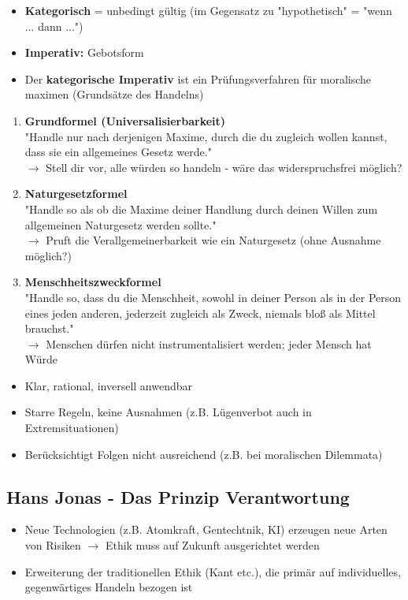 \begin{itemize}
    \item \textbf{Kategorisch} = unbedingt gültig (im Gegensatz zu "hypothetisch" = "wenn ... dann ...")
    \item \textbf{Imperativ:} Gebotsform
    \item Der \textbf{kategorische Imperativ} ist ein Prüfungsverfahren für moralische maximen (Grundsätze des Handelns)
\end{itemize}

\begin{enumerate}
    \item \textbf{Grundformel (Universalisierbarkeit)} \\
    "Handle nur nach derjenigen Maxime, durch die du zugleich wollen kannst, dass sie ein allgemeines Gesetz werde." \\
    $\rightarrow$ Stell dir vor, alle würden so handeln - wäre das widerspruchsfrei möglich?
    \item \textbf{Naturgesetzformel} \\
    "Handle so als ob die Maxime deiner Handlung durch deinen Willen zum allgemeinen Naturgesetz werden sollte." \\
    $\rightarrow$ Pruft die Verallgemeinerbarkeit wie ein Naturgesetz (ohne Ausnahme möglich?)
    \item \textbf{Menschheitszweckformel} \\
    "Handle so, dass du die Menschheit, sowohl in deiner Person als in der Person eines jeden anderen, jederzeit zugleich als Zweck, niemals bloß als Mittel brauchst." \\
    $\rightarrow$ Menschen dürfen nicht instrumentalisiert werden; jeder Mensch hat Würde
\end{enumerate}

\begin{itemize}
    \item Klar, rational, inversell anwendbar
    \item Starre Regeln, keine Ausnahmen (z.B. Lügenverbot auch in Extremsituationen)
    \item Berücksichtigt Folgen nicht ausreichend (z.B. bei moralischen Dilemmata)
\end{itemize}


\subsection{Hans Jonas - Das Prinzip Verantwortung}
\begin{itemize}
    \item Neue Technologien (z.B. Atomkraft, Gentechtnik, KI) erzeugen neue Arten von Risiken $\rightarrow$ Ethik muss auf Zukunft ausgerichtet werden
    \item Erweiterung der traditionellen Ethik (Kant etc.), die primär auf individuelles, gegenwärtiges Handeln bezogen ist
\end{itemize}

